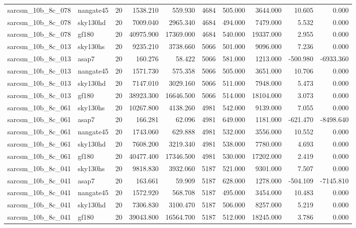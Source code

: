 \documentclass{article}
\begin{document}
\begin{longtable}{llrrrrrrrr}
sarcsm\_10b\_8c\_078 & nangate45 & 20 & 1538.210 & 559.930 & 4684 & 505.000 & 3644.000 & 10.605 & 0.000 \\
sarcsm\_10b\_8c\_078 & sky130hd & 20 & 7009.040 & 2965.340 & 4684 & 494.000 & 7479.000 & 5.532 & 0.000 \\
sarcsm\_10b\_8c\_078 & gf180 & 20 & 40975.900 & 17369.000 & 4684 & 540.000 & 19337.000 & 2.955 & 0.000 \\
sarcsm\_10b\_8c\_013 & sky130hs & 20 & 9235.210 & 3738.660 & 5066 & 501.000 & 9096.000 & 7.236 & 0.000 \\
sarcsm\_10b\_8c\_013 & asap7 & 20 & 160.276 & 58.422 & 5066 & 581.000 & 1213.000 & -500.980 & -6933.360 \\
sarcsm\_10b\_8c\_013 & nangate45 & 20 & 1571.730 & 575.358 & 5066 & 505.000 & 3651.000 & 10.706 & 0.000 \\
sarcsm\_10b\_8c\_013 & sky130hd & 20 & 7147.010 & 3029.160 & 5066 & 511.000 & 7948.000 & 5.473 & 0.000 \\
sarcsm\_10b\_8c\_013 & gf180 & 20 & 38923.300 & 16646.500 & 5066 & 514.000 & 18104.000 & 3.073 & 0.000 \\
sarcsm\_10b\_8c\_061 & sky130hs & 20 & 10267.800 & 4138.260 & 4981 & 542.000 & 9139.000 & 7.055 & 0.000 \\
sarcsm\_10b\_8c\_061 & asap7 & 20 & 166.281 & 62.096 & 4981 & 649.000 & 1181.000 & -621.470 & -8498.640 \\
sarcsm\_10b\_8c\_061 & nangate45 & 20 & 1743.060 & 629.888 & 4981 & 532.000 & 3556.000 & 10.552 & 0.000 \\
sarcsm\_10b\_8c\_061 & sky130hd & 20 & 7608.200 & 3219.340 & 4981 & 538.000 & 7780.000 & 4.693 & 0.000 \\
sarcsm\_10b\_8c\_061 & gf180 & 20 & 40477.400 & 17346.500 & 4981 & 530.000 & 17202.000 & 2.419 & 0.000 \\
sarcsm\_10b\_8c\_041 & sky130hs & 20 & 9818.830 & 3932.060 & 5187 & 521.000 & 9301.000 & 7.507 & 0.000 \\
sarcsm\_10b\_8c\_041 & asap7 & 20 & 163.661 & 59.909 & 5187 & 628.000 & 1278.000 & -504.109 & -7145.810 \\
sarcsm\_10b\_8c\_041 & nangate45 & 20 & 1572.920 & 568.708 & 5187 & 495.000 & 3454.000 & 10.483 & 0.000 \\
sarcsm\_10b\_8c\_041 & sky130hd & 20 & 7306.830 & 3100.470 & 5187 & 506.000 & 8257.000 & 5.219 & 0.000 \\
sarcsm\_10b\_8c\_041 & gf180 & 20 & 39043.800 & 16564.700 & 5187 & 512.000 & 18245.000 & 3.786 & 0.000 \\

\end{longtable}
\end{document}
